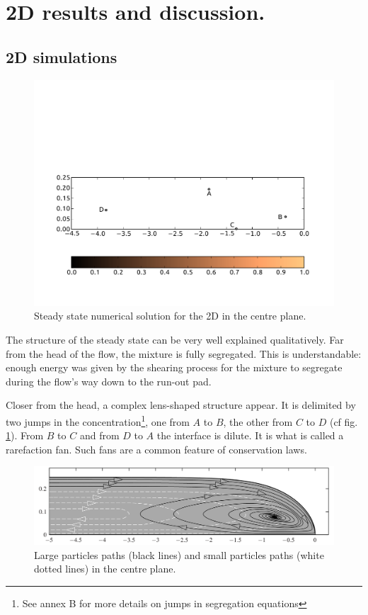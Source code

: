 

\section{2D results and discussion.}
\subsection{2D simulations}

\begin{figure}[htp]
\centering
\includegraphics[scale=0.70]{vector/spiral_edit.pdf}
\caption{Steady state numerical solution for the 2D in the centre plane.}
\label{spiral}
\end{figure} 

The structure of the steady state can be very well explained qualitatively. Far from the head of the flow, the mixture is fully segregated. This is understandable: enough energy was given by the shearing process for the mixture to segregate during the flow's way down to the run-out pad. 

Closer from the head, a complex lens-shaped structure appear. It is delimited by two jumps in the concentration\footnote{See annex B for more details on jumps in segregation equations}, one from $A$ to $B$, the other from $C$ to $D$ (cf fig. \ref{spiral}). From $B$ to $C$ and from $D$ to $A$ the interface is dilute. It is what is called a rarefaction fan. Such fans are a common feature of conservation laws.

\begin{figure}[htp]
\centering
\includegraphics[scale=0.25]{images/pp.png}
\caption{Large particles paths (black lines) and small particles paths (white dotted lines) in the centre plane.}
\label{pp}
\end{figure} 

